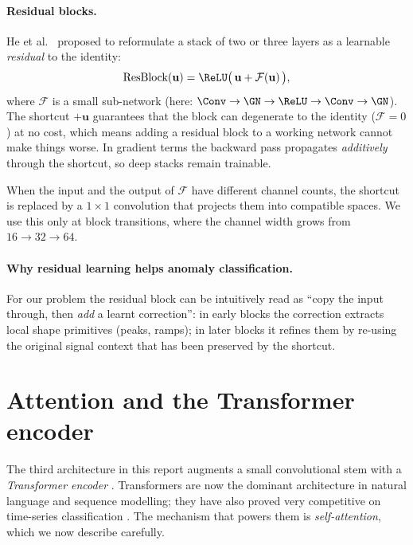 \paragraph{Residual blocks.}
He et al.\ \cite{he2016deep} proposed to reformulate a stack of two or
three layers as a learnable \emph{residual} to the identity:
\begin{equation}
    \mathrm{ResBlock}(\mathbf{u}) = \ReLU\bigl(\, \mathbf{u} + \mathcal{F}(\mathbf{u}) \,\bigr),
    \label{eq:resblock}
\end{equation}
where $\mathcal{F}$ is a small sub-network (here: $\Conv \to \GN \to
\ReLU \to \Conv \to \GN$). The shortcut $+\mathbf{u}$ guarantees that
the block can degenerate to the identity ($\mathcal{F}=0$) at no cost,
which means adding a residual block to a working network cannot make
things worse. In gradient terms the backward pass propagates
\emph{additively} through the shortcut, so deep stacks remain
trainable.

When the input and the output of $\mathcal{F}$ have different channel
counts, the shortcut is replaced by a $1{\times}1$ convolution that
projects them into compatible spaces. We use this only at block
transitions, where the channel width grows from $16 \to 32 \to 64$.

\paragraph{Why residual learning helps anomaly classification.}
For our problem the residual block can be intuitively read as ``copy
the input through, then \emph{add} a learnt correction'': in early
blocks the correction extracts local shape primitives (peaks, ramps);
in later blocks it refines them by re-using the original signal context
that has been preserved by the shortcut.

\section{Attention and the Transformer encoder}
\label{sec:attention-theory}

The third architecture in this report augments a small convolutional
stem with a \emph{Transformer encoder} \cite{vaswani2017attention}.
Transformers are now the dominant architecture in natural language and
sequence modelling; they have also proved very competitive on
time-series classification \cite{hu2022eeg}. The mechanism that powers
them is \emph{self-attention}, which we now describe carefully.

